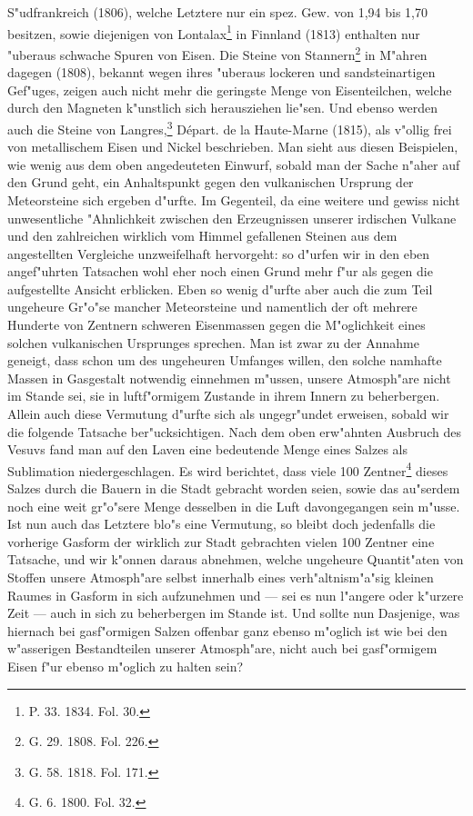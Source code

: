 \documentclass[a4paper, 8pt, oneside, polutonikogreek, german]{article}
\begin{document}
S"udfrankreich (1806), welche Letztere nur ein spez. Gew. von 1,94 bis 1,70 besitzen, sowie diejenigen von Lontalax\footnote{P. 33. 1834. Fol. 30.} in Finnland (1813) enthalten nur "uberaus schwache Spuren von Eisen. Die Steine von Stannern\footnote{G. 29. 1808. Fol. 226.} in M"ahren dagegen (1808), bekannt wegen ihres "uberaus lockeren und sandsteinartigen Gef"uges, zeigen auch nicht mehr die geringste Menge von Eisenteilchen, welche durch den Magneten k"unstlich sich herausziehen lie"sen. Und ebenso werden auch die Steine von Langres,\footnote{G. 58. 1818. Fol. 171.} Départ. de la Haute-Marne (1815), als v"ollig frei von metallischem Eisen und Nickel beschrieben. Man sieht aus diesen Beispielen, wie wenig aus dem oben angedeuteten Einwurf, sobald man der Sache n"aher auf den Grund geht, ein Anhaltspunkt gegen den vulkanischen Ursprung der Meteorsteine sich ergeben d"urfte. Im Gegenteil, da eine weitere und gewiss nicht unwesentliche "Ahnlichkeit zwischen den Erzeugnissen unserer irdischen Vulkane und den zahlreichen wirklich vom Himmel gefallenen Steinen aus dem angestellten Vergleiche unzweifelhaft hervorgeht: so d"urfen wir in den eben angef"uhrten Tatsachen wohl eher noch einen Grund mehr f"ur als gegen die aufgestellte Ansicht erblicken. Eben so wenig d"urfte aber auch die zum Teil ungeheure Gr"o"se mancher Meteorsteine und namentlich der oft mehrere Hunderte von Zentnern schweren Eisenmassen gegen die M"oglichkeit eines solchen vulkanischen Ursprunges sprechen. Man ist zwar zu der Annahme geneigt, dass schon um des ungeheuren Umfanges willen, den solche namhafte Massen in Gasgestalt notwendig einnehmen m"ussen, unsere Atmosph"are nicht im Stande sei, sie in luftf"ormigem Zustande in ihrem Innern zu beherbergen. Allein auch diese Vermutung d"urfte sich als ungegr"undet erweisen, sobald wir die folgende Tatsache ber"ucksichtigen. Nach dem oben erw"ahnten Ausbruch des Vesuvs fand man auf den Laven eine bedeutende Menge eines Salzes als Sublimation niedergeschlagen. Es wird berichtet, dass viele 100 Zentner\footnote{G. 6. 1800. Fol. 32.} dieses Salzes durch die Bauern in die Stadt gebracht worden seien, sowie das au"serdem noch eine weit gr"o"sere Menge desselben in die Luft davongegangen sein m"usse. Ist nun auch das Letztere blo"s eine Vermutung, so bleibt doch jedenfalls die vorherige Gasform der wirklich zur Stadt gebrachten vielen 100 Zentner eine Tatsache, und wir k"onnen daraus abnehmen, welche ungeheure Quantit"aten von Stoffen unsere Atmosph"are selbst innerhalb eines verh"altnism"a"sig kleinen Raumes in Gasform in sich aufzunehmen und --- sei es nun l"angere oder k"urzere Zeit --- auch in sich zu beherbergen im Stande ist. Und sollte nun Dasjenige, was hiernach bei gasf"ormigen Salzen offenbar ganz ebenso m"oglich ist wie bei den w"asserigen Bestandteilen unserer Atmosph"are, nicht auch bei gasf"ormigem Eisen f"ur ebenso m"oglich zu halten sein?
\end{document}
